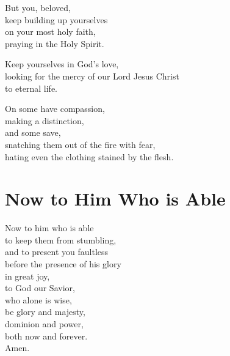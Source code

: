 But you, beloved,
\\
keep building up yourselves
\\
\tab{}
on your most holy faith,
\\
praying in the Holy Spirit.

Keep yourselves in God's love,
\\
looking for the mercy of our Lord Jesus Christ
\\
\tab{}
to eternal life.

On some have compassion,
\\
\tab{}
making a distinction,
\\
and some save,
\\
\tab{}
snatching them out of the fire with fear,
\\
\tab{}
hating even the clothing stained by the flesh.

\newpage\section{Now to Him Who is Able}

Now to him who is able
\\
\tab{}
to keep them from stumbling,
\\
\tab{}
and to present you faultless
\\
\tab{}
\tab{}
before the presence of his glory
\\
\tab{}
\tab{}
\tab{}
in great joy,
\\
to God our Savior,
\\
\tab{}
who alone is wise,
\\
\tab{}
\tab{}
be glory and majesty,
\\
\tab{}
\tab{}
dominion and power,
\\
\tab{}
\tab{}
both now and forever.
\\
Amen.

